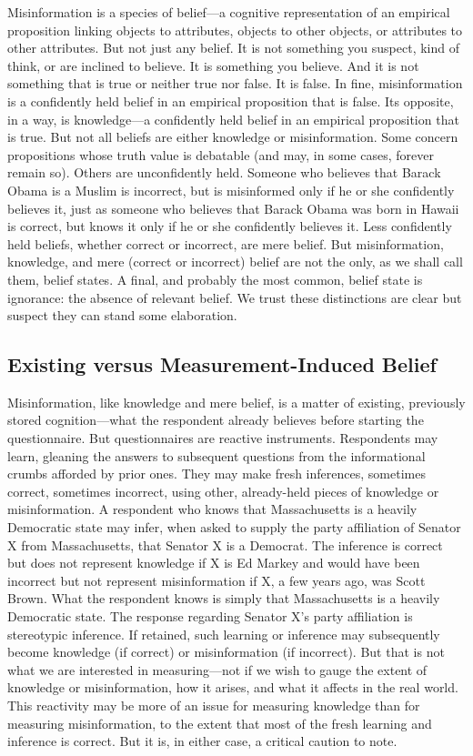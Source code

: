\documentclass[11pt]{article}
\begin{document}
Misinformation is a species of belief---a cognitive representation of an empirical proposition linking objects to attributes, objects to other objects, or attributes to other attributes. But not just any belief. It is not something you suspect, kind of think, or are inclined to believe. It is something you believe. And it is not something that is true or neither true nor false. It is false. In fine, misinformation is a confidently held belief in an empirical proposition that is false. Its opposite, in a way, is knowledge---a confidently held belief in an empirical proposition that is true. But not all beliefs are either knowledge or misinformation. Some concern propositions whose truth value is debatable (and may, in some cases, forever remain so). Others are unconfidently held. Someone who believes that Barack Obama is a Muslim is incorrect, but is misinformed only if he or she confidently believes it, just as someone who believes that Barack Obama was born in Hawaii is correct, but knows it only if he or she confidently believes it. Less confidently held beliefs, whether correct or incorrect, are mere belief. But misinformation, knowledge, and mere (correct or incorrect) belief are not the only, as we shall call them, belief states. A final, and probably the most common, belief state is ignorance: the absence of relevant belief. We trust these distinctions are clear but suspect they can stand some elaboration.

\subsection{Existing versus Measurement-Induced Belief}

Misinformation, like knowledge and mere belief, is a matter of existing, previously stored cognition---what the respondent already believes before starting the questionnaire. But questionnaires are reactive instruments. Respondents may learn, gleaning the answers to subsequent questions from the informational crumbs afforded by prior ones. They may make fresh inferences, sometimes correct, sometimes incorrect, using other, already-held pieces of knowledge or misinformation. A respondent who knows that Massachusetts is a heavily Democratic state may infer, when asked to supply the party affiliation of Senator X from Massachusetts, that Senator X is a Democrat. The inference is correct but does not represent knowledge if X is Ed Markey and would have been incorrect but not represent misinformation if X, a few years ago, was Scott Brown. What the respondent knows is simply that Massachusetts is a heavily Democratic state. The response regarding Senator X's party affiliation is stereotypic inference. If retained, such learning or inference may subsequently become knowledge (if correct) or misinformation (if incorrect). But that is not what we are interested in measuring---not if we wish to gauge the extent of knowledge or misinformation, how it arises, and what it affects in the real world. This reactivity may be more of an issue for measuring knowledge than for measuring misinformation, to the extent that most of the fresh learning and inference is correct. But it is, in either case, a critical caution to note.
\end{document}
